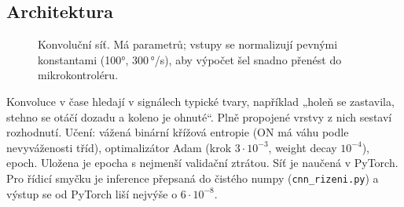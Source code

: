 \documentclass[11pt,a4paper]{article}
\begin{document}
\subsection{Architektura}
\begin{figure}[H]
\centering
{}
\caption{Konvoluční síť. Má \CnnParam{} parametrů; vstupy se normalizují pevnými
konstantami (100°, 300\,°/s), aby výpočet šel snadno přenést do mikrokontroléru.}
\end{figure}

Konvoluce v čase hledají v signálech typické tvary, například „holeň se zastavila, stehno se otáčí
dozadu a koleno je ohnuté“. Plně propojené vrstvy z nich sestaví rozhodnutí.
Učení: vážená binární křížová entropie (ON má váhu podle nevyváženosti tříd), optimalizátor Adam
(krok $3\cdot10^{-3}$, weight decay $10^{-4}$), \CnnEpochy{} epoch. Uložena je epocha
s nejmenší validační ztrátou.
Síť je naučená v PyTorch. Pro řídicí smyčku je inference přepsaná do čistého numpy
(\texttt{cnn\_rizeni.py}) a výstup se od PyTorch liší nejvýše o $6\cdot10^{-8}$.
\end{document}
